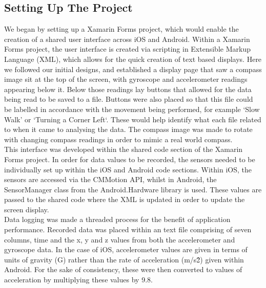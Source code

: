 \documentclass[main.tex]{subfiles}
\begin{document}

\subsection{Setting Up The Project}

We began by setting up a Xamarin Forms project, which would enable the creation of a shared user interface across iOS and Android. Within a Xamarin Forms project, the user interface is created via scripting in Extensible Markup Language (XML), which allows for the quick creation of text based displays. Here we followed our initial designs, and established a display page that saw a compass image sit at the top of the screen, with gyroscope and accelerometer readings appearing below it. Below those readings lay buttons that allowed for the data being read to be saved to a file. Buttons were also placed so that this file could be labelled in accordance with the movement being performed, for example `Slow Walk' or `Turning a Corner Left`.  These would help identify what each file related to when it came to analysing the data. The compass image was made to rotate with changing compass readings in order to mimic a real world compass.\\

This interface was developed within the shared code section of the Xamarin Forms project. In order for data values to be recorded, the sensors needed to be individually set up within the iOS and Android code sections. Within iOS, the sensors are accessed via the CMMotion API, whilst in Android, the SensorManager class from the Android.Hardware library is used. These values are passed to the shared code where the XML is updated in order to update the screen display.\\

Data logging was made a threaded process for the benefit of application performance. Recorded data was placed within an text file comprising of seven columns, time and the x, y and z values from both the accelerometer and gyroscope data. In the case of iOS, accelerometer values are given in terms of units of gravity (G) rather than the rate of acceleration (m/s\^2) given within Android. For the sake of consistency, these were then converted to values of acceleration by multiplying these values by 9.8.\\
\end{document}
